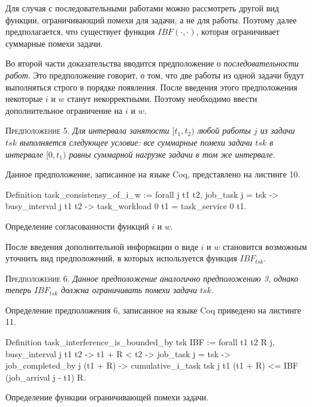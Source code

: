 Для случая с последовательными работами можно рассмотреть другой вид функции, ограничивающий
  помехи для задачи, а не для работы. Поэтому далее предполагается, что существует
  функция $IBF(\cdot, \cdot)$, которая ограничивает суммарные помехи задачи.

Во второй части доказательства вводится предположение о \textit{последовательности работ}.
  Это предположение говорит, о том, что две работы из одной задачи будут выполняться строго в порядке появления.
  После введения этого предположения некоторые $i$ и $w$ станут некорректными.
  Поэтому необходимо ввести дополнительное ограничение на $i$ и $w$.

\textsc{Предположение 5.}
\textit{Для интервала занятости $[t_1, t_2)$ любой работы $j$ из задачи $tsk$ выполняется следующее условие:
  все суммарные помехи задачи $tsk$ в интервале $[0, t_1)$ равны суммарной нагрузке задачи в том же интервале. }

Данное предположение, записанное на языке Coq, представлено на листинге 10.

\begin{listing}
\begin{pyglist}[numbers=none,numbersep=5pt, fontsize=\small]
  Definition task_consistensy_of_i_w :=
    forall j t1 t2,
      job_task j = tsk ->
      busy_interval j t1 t2 ->
      task_workload 0 t1 = task_service 0 t1.
\end{pyglist}
\caption{Определение согласованности функций $i$ и $w$. }
\label{lst:theorem2}
\end{listing}

После введения дополнительной информации о виде $i$ и $w$ становится
  возможным уточнить вид предположений, в которых используется функция $IBF_{tsk}$.

\textsc{Предположение 6.}
\textit{Данное предположение аналогично предположению 3, однако теперь $IBF_{tsk}$ должна
  ограничивать помехи задачи $tsk$.}

Определение предположения 6, записанное на языке Coq приведено на листинге 11.

\begin{listing}
\begin{pyglist}[numbers=none,numbersep=5pt, fontsize=\small]
  Definition task_interference_is_bounded_by tsk IBF :=
    forall t1 t2 R j,
      busy_interval j t1 t2 ->
      t1 + R < t2 ->
      job_task j = tsk ->
      ~~ job_completed_by j (t1 + R) ->
      cumulative_i_task tsk j t1 (t1 + R)
          <= IBF (job_arrival j - t1) R.
\end{pyglist}
\caption{Определение функции ограничивающей помехи задачи. }
\label{lst:theorem2}
\end{listing}


